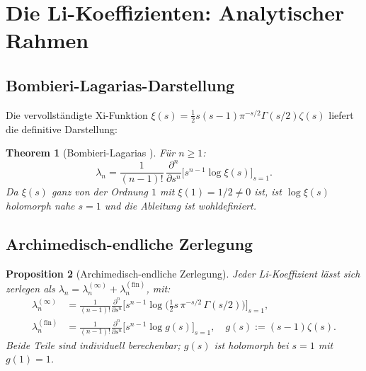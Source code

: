 \documentclass[12pt,a4paper]{article}
\newtheorem{theorem}{Theorem}[section]
\newtheorem{proposition}[theorem]{Proposition}
\theoremstyle{definition}
\theoremstyle{remark}
\begin{document}
\section{Die Li-Koeffizienten: Analytischer Rahmen}
\label{sec:li-coefficients}

\subsection{Bombieri-Lagarias-Darstellung}

Die vervollständigte Xi-Funktion $\xi(s) = \frac{1}{2}s(s-1)\pi^{-s/2}\Gamma(s/2)\zeta(s)$ liefert die definitive Darstellung:

\begin{theorem}[Bombieri-Lagarias \cite{BombieriLagarias1999}]
\label{thm:bombieri-lagarias}
Für $n \geq 1$:
\[
\lambda_n = \frac{1}{(n-1)!}\,\frac{\partial^n}{\partial s^n}\Big[s^{n-1}\log\xi(s)\Big]_{s=1}.
\]
Da $\xi(s)$ ganz von der Ordnung $1$ mit $\xi(1) = 1/2 \neq 0$ ist, ist $\log\xi(s)$ holomorph nahe $s = 1$ und die Ableitung ist wohldefiniert.
\end{theorem}

\subsection{Archimedisch-endliche Zerlegung}

\begin{proposition}[Archimedisch-endliche Zerlegung]
\label{prop:decomposition}
Jeder Li-Koeffizient lässt sich zerlegen als $\lambda_n = \lambda_n^{(\infty)} + \lambda_n^{(\mathrm{fin})}$, mit:
\begin{align}
\lambda_n^{(\infty)} &= \frac{1}{(n-1)!}\frac{\partial^n}{\partial s^n}\Big[s^{n-1}\log\!\big(\tfrac{1}{2}s\,\pi^{-s/2}\,\Gamma(s/2)\big)\Big]_{s=1}, \label{eq:arch-part} \\
\lambda_n^{(\mathrm{fin})} &= \frac{1}{(n-1)!}\frac{\partial^n}{\partial s^n}\Big[s^{n-1}\log g(s)\Big]_{s=1}, \quad g(s) := (s-1)\zeta(s). \label{eq:fin-part}
\end{align}
Beide Teile sind individuell berechenbar; $g(s)$ ist holomorph bei $s=1$ mit $g(1) = 1$.
\end{proposition}
\end{document}
